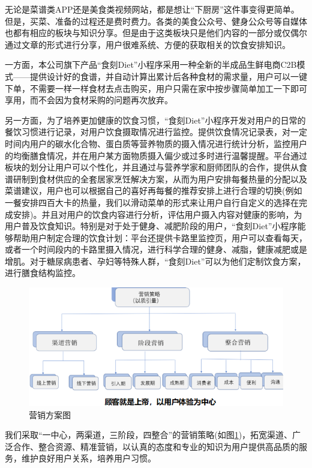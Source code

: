 \documentclass[UTF8,12pt]{ctexart}
\numberwithin{figure}{section}%
\begin{document}
\begin{spacing}{2}
无论是菜谱类APP还是美食类视频网站，都是想让“下厨房”这件事变得更简单。但是，买菜、准备的过程还是费时费力。各类的美食公众号、健身公众号等自媒体也都有相应的板块与知识分享。但是由于这类板块只是他们内容的一部分或仅偶尔通过文章的形式进行分享，用户很难系统、方便的获取相关的饮食安排知识。

一方面，本公司旗下产品“食刻Diet”小程序采用一种全新的半成品生鲜电商C2B模式——提供设计好的食谱，并自动计算出累计后各种食材的需求量，用户可以一键下单，不需要一样一样食材去点击购买，用户只需在家中按步骤简单加工一下即可享用，而不会因为食材采购的问题再次放弃。

另一方面，为了培养更加健康的饮食习惯，“食刻Diet”小程序开发对用户的日常的餐饮习惯进行记录，对用户饮食摄取情况进行监控。提供饮食情况记录表，对一定时间内用户的碳水化合物、蛋白质等营养物质的摄入情况进行统计分析，监控用户的均衡膳食情况，并在用户某方面物质摄入偏少或过多时进行温馨提醒。平台通过板块的划分让用户可以个性化，并且通过与营养学家和厨师团队的合作，提供从食谱研制到食材供应的全套居家烹饪解决方案，从而为用户安排每餐热量的分配以及菜谱建议，用户也可以根据自己的喜好再每餐的推荐安排上进行合理的切换(例如一餐安排四百大卡的热量，我们以滑动菜单的形式来让用户自行自定义的选择在完成安排)。并且对用户的饮食内容进行分析，评估用户摄入内容对健康的影响，为用户普及饮食知识。特别是对于处于健身、减肥阶段的用户，“食刻Diet”小程序能够帮助用户制定合理的饮食计划：平台还提供卡路里监控页，用户可以查看每天，或者一个时间段内的卡路里摄入情况，进行科学合理的健身、减脂，健康减肥或是增肌。对于糖尿病患者、孕妇等特殊人群，“食刻Diet”可以为他们定制饮食方案，进行膳食结构监控。

\begin{figure}[!htb]
	\centering
	\includegraphics[width=14cm]{fig/21}
	\caption{营销方案图}\label{xsh}
\end{figure}

我们采取“一中心，两渠道，三阶段，四整合”的营销策略(如图\ref{xsh})，拓宽渠道、广泛合作、整合资源、精准营销，以认真的态度和专业的知识为用户提供高品质的服务，维护良好用户关系，培养用户习惯。 


\end{spacing}
\end{document}
